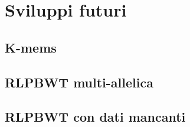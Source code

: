 \section{Sviluppi futuri}
\subsection{K-mems}
\subsection{RLPBWT multi-allelica}
\subsection{RLPBWT con dati mancanti}